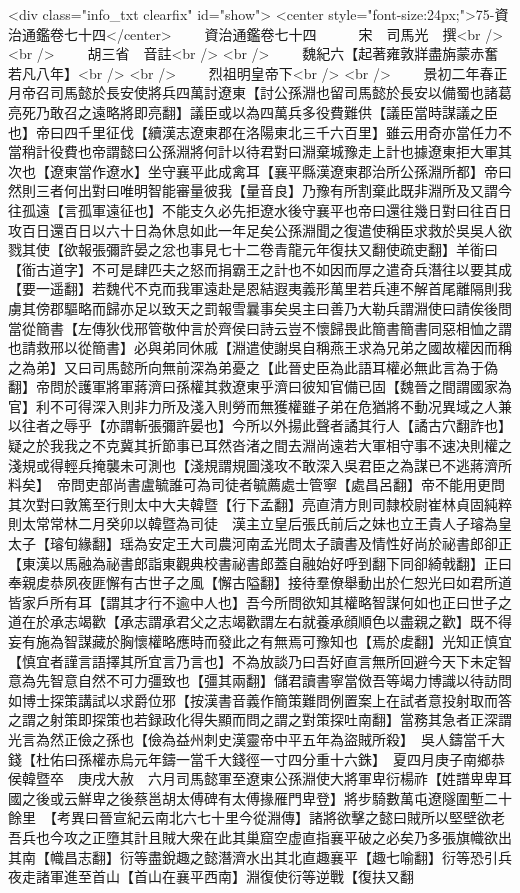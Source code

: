 <div class="info_txt clearfix" id="show">
<center style="font-size:24px;">75-資治通鑑卷七十四</center>
  　　資治通鑑卷七十四　　　宋　司馬光　撰<br />
<br />
　　胡三省　音註<br />
<br />
　　魏紀六【起著雍敦牂盡旃蒙赤奮若凡八年】<br />
<br />
　　烈祖明皇帝下<br />
<br />
　　景初二年春正月帝召司馬懿於長安使將兵四萬討遼東【討公孫淵也留司馬懿於長安以備蜀也諸葛亮死乃敢召之遠略將即亮翻】議臣或以為四萬兵多役費難供【議臣當時謀議之臣也】帝曰四千里征伐【續漢志遼東郡在洛陽東北三千六百里】雖云用奇亦當任力不當稍計役費也帝謂懿曰公孫淵將何計以待君對曰淵棄城豫走上計也據遼東拒大軍其次也【遼東當作遼水】坐守襄平此成禽耳【襄平縣漢遼東郡治所公孫淵所都】帝曰然則三者何出對曰唯明智能審量彼我【量音良】乃豫有所割棄此既非淵所及又謂今往孤遠【言孤軍遠征也】不能支久必先拒遼水後守襄平也帝曰還往幾日對曰往百日攻百日還百日以六十日為休息如此一年足矣公孫淵聞之復遣使稱臣求救於吳吳人欲戮其使【欲報張彌許晏之忿也事見七十二卷青龍元年復扶又翻使疏吏翻】羊衜曰【衜古道字】不可是肆匹夫之怒而捐霸王之計也不如因而厚之遣奇兵潛往以要其成【要一遥翻】若魏代不克而我軍遠赴是恩結遐夷義形萬里若兵連不解首尾離隔則我虜其傍郡驅略而歸亦足以致天之罰報雪曩事矣吳主曰善乃大勒兵謂淵使曰請俟後問當從簡書【左傳狄伐邢管敬仲言於齊侯曰詩云豈不懷歸畏此簡書簡書同惡相恤之謂也請救邢以從簡書】必與弟同休戚【淵遣使謝吳自稱燕王求為兄弟之國故權因而稱之為弟】又曰司馬懿所向無前深為弟憂之【此晉史臣為此語耳權必無此言為于偽翻】帝問於護軍將軍蔣濟曰孫權其救遼東乎濟曰彼知官備已固【魏晉之間謂國家為官】利不可得深入則非力所及淺入則勞而無獲權雖子弟在危猶將不動况異域之人兼以往者之辱乎【亦謂斬張彌許晏也】今所以外揚此聲者譎其行人【譎古穴翻詐也】疑之於我我之不克冀其折節事已耳然沓渚之間去淵尚遠若大軍相守事不速决則權之淺規或得輕兵掩襲未可測也【淺規謂規圖淺攻不敢深入吳君臣之為謀已不逃蔣濟所料矣】　帝問吏部尚書盧毓誰可為司徒者毓薦處士管寧【處昌呂翻】帝不能用更問其次對曰敦篤至行則太中大夫韓暨【行下孟翻】亮直清方則司隸校尉崔林貞固純粹則太常常林二月癸卯以韓暨為司徒　漢主立皇后張氏前后之妹也立王貴人子璿為皇太子【璿旬緣翻】瑶為安定王大司農河南孟光問太子讀書及情性好尚於祕書郎卻正【東漢以馬融為祕書郎詣東觀典校書祕書郎蓋自融始好呼到翻下同卻綺戟翻】正曰奉親䖍恭夙夜匪懈有古世子之風【懈古隘翻】接待羣僚舉動出於仁恕光曰如君所道皆家戶所有耳【謂其才行不逾中人也】吾今所問欲知其權略智謀何如也正曰世子之道在於承志竭歡【承志謂承君父之志竭歡謂左右就養承顔順色以盡親之歡】既不得妄有施為智謀藏於胸懷權略應時而發此之有無焉可豫知也【焉於䖍翻】光知正慎宜【慎宜者謹言語擇其所宜言乃言也】不為放談乃曰吾好直言無所回避今天下未定智意為先智意自然不可力彊致也【彊其兩翻】儲君讀書寧當傚吾等竭力博識以待訪問如博士探策講試以求爵位邪【按漢書音義作簡策難問例置案上在試者意投射取而答之謂之射策即探策也若録政化得失顯而問之謂之對策探吐南翻】當務其急者正深謂光言為然正儉之孫也【儉為益州刺史漢靈帝中平五年為盜賊所殺】　吳人鑄當千大錢【杜佑曰孫權赤烏元年鑄一當千大錢徑一寸四分重十六銖】　夏四月庚子南鄉恭侯韓暨卒　庚戌大赦　六月司馬懿軍至遼東公孫淵使大將軍卑衍楊祚【姓譜卑卑耳國之後或云鮮卑之後蔡邕胡太傅碑有太傅掾雁門卑登】將步騎數萬屯遼隧圍塹二十餘里　【考異曰晉宣紀云南北六七十里今從淵傳】諸將欲擊之懿曰賊所以堅壁欲老吾兵也今攻之正墮其計且賊大衆在此其巢窟空虚直指襄平破之必矣乃多張旗幟欲出其南【幟昌志翻】衍等盡銳趣之懿潛濟水出其北直趣襄平【趣七喻翻】衍等恐引兵夜走諸軍進至首山【首山在襄平西南】淵復使衍等逆戰【復扶又翻